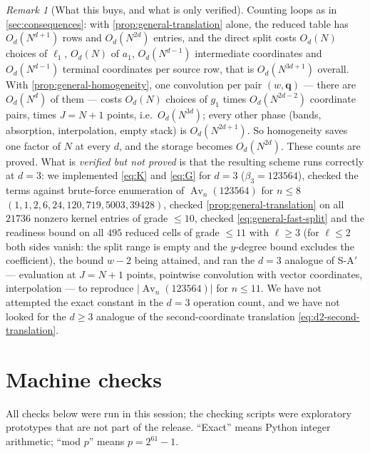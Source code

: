 \documentclass[11pt,reqno]{amsart}
\theoremstyle{definition}
\theoremstyle{remark}
\newtheorem{remark}[theorem]{Remark}
\newcommand{\Av}{\operatorname{Av}}
\begin{document}
\begin{remark}[What this buys, and what is only
verified]\label{rem:general-d}
Counting loops as in \cref{sec:consequences}: with
\cref{prop:general-translation} alone, the reduced table has $O_d(N^{d+1})$
rows and $O_d(N^{2d})$ entries, and the direct split costs $O_d(N)$ choices
of $\ell_1$, $O_d(N)$ of $a_1$, $O_d(N^{d-1})$ intermediate coordinates and
$O_d(N^{d-1})$ terminal coordinates per source row, that is $O_d(N^{3d+1})$
overall.  With \cref{prop:general-homogeneity}, one convolution per pair
$(w,\mathbf q)$ --- there are $O_d(N^{d})$ of them --- costs $O_d(N)$
choices of $g_1$ times $O_d(N^{2d-2})$ coordinate pairs, times $J=N+1$
points, i.e.\ $O_d(N^{3d})$; every other phase (bands, absorption,
interpolation, empty stack) is $O_d(N^{2d+1})$.  So homogeneity saves one
factor of $N$ at every $d$, and the storage becomes $O_d(N^{2d})$.  These
counts are proved.  What is \emph{verified but not proved} is that the
resulting scheme runs correctly at $d=3$: we implemented \eqref{eq:K} and
\eqref{eq:G} for $d=3$ ($\beta_3=123564$), checked the terms against
brute-force enumeration of $\Av_n(123564)$ for $n\leq8$
$(1,1,2,6,24,120,719,5003,39428)$, checked
\cref{prop:general-translation} on all $21736$ nonzero kernel entries of
grade $\leq10$, checked \eqref{eq:general-fast-split} and the readiness
bound on all $495$ reduced cells of grade $\leq11$ with $\ell\geq3$ (for
$\ell\leq2$ both sides vanish: the split range is empty and the $y$-degree
bound excludes the coefficient), the bound $w-2$ being
attained, and ran the $d=3$ analogue of S-A$'$ --- evaluation at $J=N+1$
points, pointwise convolution with vector coordinates, interpolation --- to
reproduce $|\Av_n(123564)|$ for $n\leq11$.  We have not attempted the exact
constant in the $d=3$ operation count, and we have not looked for the
$d\geq3$ analogue of the second-coordinate translation
\eqref{eq:d2-second-translation}.
\end{remark}

\section{Machine checks}\label{sec:checks}

All checks below were run in this session; the checking scripts were
exploratory prototypes that are not part of the release.  ``Exact'' means Python
integer arithmetic; ``mod $p$'' means $p=2^{61}-1$.
\end{document}
